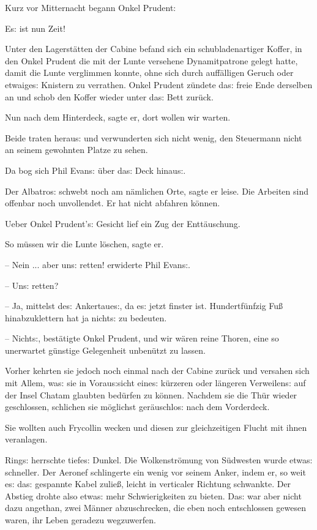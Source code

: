 \documentclass[oneside,12pt]{book}
\newcommand{\s}{s:}
\begin{document}
Kurz vor Mitternacht begann Onkel Prudent:

{\glqq}E{\s} ist nun Zeit!{\grqq}

Unter den Lagerst\"atten der Cabine befand sich ein schubladenartiger
Koffer, in den Onkel Prudent die mit der Lunte versehene
Dynamitpatrone gelegt hatte, damit die Lunte verglimmen konnte, ohne
sich durch auf\/f\"alligen Geruch oder etwaige{\s} Knistern zu
verrathen. Onkel Prudent z\"undete da{\s} freie Ende derselben an und
schob den Koffer wieder unter da{\s} Bett zur\"uck.

{\glqq}Nun nach dem Hinterdeck, sagte er, dort wollen wir
warten.{\grqq}

Beide traten herau{\s} und verwunderten sich nicht wenig, den
Steuermann nicht an seinem gewohnten Platze zu sehen.

Da bog sich Phil Evan{\s} \"uber da{\s} Deck hinau{\s}.

{\glqq}Der {\glqq}Albatro{\s}{\grqq} schwebt noch am n\"amlichen
Orte, sagte er leise. Die Arbeiten sind offenbar noch unvollendet. Er
hat nicht abfahren k\"onnen.{\grqq}

Ueber Onkel Prudent'{\s} Gesicht lief ein Zug der Entt\"auschung.

{\glqq}So m\"ussen wir die Lunte l\"oschen, sagte er.

-- Nein ... aber un{\s} retten! erwiderte Phil Evan{\s}.

-- Un{\s} retten?

-- Ja, mittelst de{\s} Ankertaue{\s}, da e{\s} jetzt finster ist.
Hundertf\"unfzig Fu{\ss} hinabzuklettern hat ja nicht{\s} zu
bedeuten.

-- Nicht{\s}, best\"atigte Onkel Prudent, und wir w\"aren reine
Thoren, eine so unerwartet g\"unstige Gelegenheit unben\"utzt zu
lassen.{\grqq}

Vorher kehrten sie jedoch noch einmal nach der Cabine zur\"uck und
versahen sich mit Allem, wa{\s} sie in Vorau{\s}sicht eine{\s}
k\"urzeren oder l\"angeren Verweilen{\s} auf der Insel Chatam
glaubten bed\"urfen zu k\"onnen. Nachdem sie die Th\"ur wieder
geschlossen, schlichen sie m\"oglichst ger\"auschlo{\s} nach dem
Vorderdeck.

Sie wollten auch Frycollin wecken und diesen zur gleichzeitigen
Flucht mit ihnen veranlagen.

Ring{\s} herrschte tiefe{\s} Dunkel. Die Wolkenstr\"omung von
S\"udwesten wurde etwa{\s} schneller. Der Aeronef schlingerte ein
wenig vor seinem Anker, indem er, so weit e{\s} da{\s} gespannte
Kabel zulie{\ss}, leicht in verticaler Richtung schwankte. Der
Abstieg drohte also etwa{\s} mehr Schwierigkeiten zu bieten. Da{\s}
war aber nicht dazu angethan, zwei M\"anner abzuschrecken, die eben
noch entschlossen gewesen waren, ihr Leben geradezu wegzuwerfen.
\end{document}

